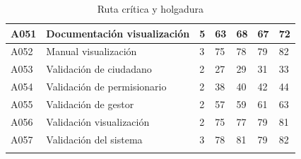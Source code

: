 \documentclass[12pt,twoside]{article}
\begin{document}
\begin{longtable}{|l|p{5cm}|l|l|l|l|l|}
    A051 & Documentación visualización & 5 & 63 & 68 & 67 & 72 \\ \hline
    A052 & Manual visualización & 3 & 75 & 78 & 79 & 82 \\ \hline
    A053 & Validación de ciudadano & 2 & 27 & 29 & 31 & 33 \\ \hline
    A054 & Validación de permisionario & 2 & 38 & 40 & 42 & 44 \\ \hline
    A055 & Validación de gestor & 2 & 57 & 59 & 61 & 63 \\ \hline
    A056 & Validación visualización & 2 & 75 & 77 & 79 & 81 \\ \hline
    A057 & Validación del sistema & 3 & 78 & 81 & 79 & 82 \\ \hline
    \caption{Ruta crítica y holgadura}
    \label{table:TabRuta}    
\end{longtable}
\end{document}

